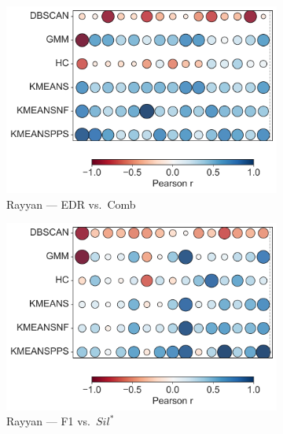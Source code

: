 \documentclass[10pt]{article} %
\numberwithin{equation}{section}
\begin{document}
\begin{figure}[htbp]
  \begin{subfigure}[b]{0.33\linewidth}
    \includegraphics[width=\linewidth]{figures/6.4.3graph/RA_EDR_vs_Combined Score.pdf}
    \caption{Rayyan — EDR vs.\ Comb}
    \label{fig:ra_edr_comb}
  \end{subfigure}\hfill
  \begin{subfigure}[b]{0.33\linewidth}
    \includegraphics[width=\linewidth]{figures/6.4.3graph/RA_F1_vs_Silhouette Score.pdf}
    \caption{Rayyan — F1 vs.\ $Sil^\ast$}
    \label{fig:ra_f1_sil}
  \end{subfigure}\hfill
  \begin{subfigure}[b]{0.33\linewidth}

\end{subfigure}
\end{figure}
\end{document}

